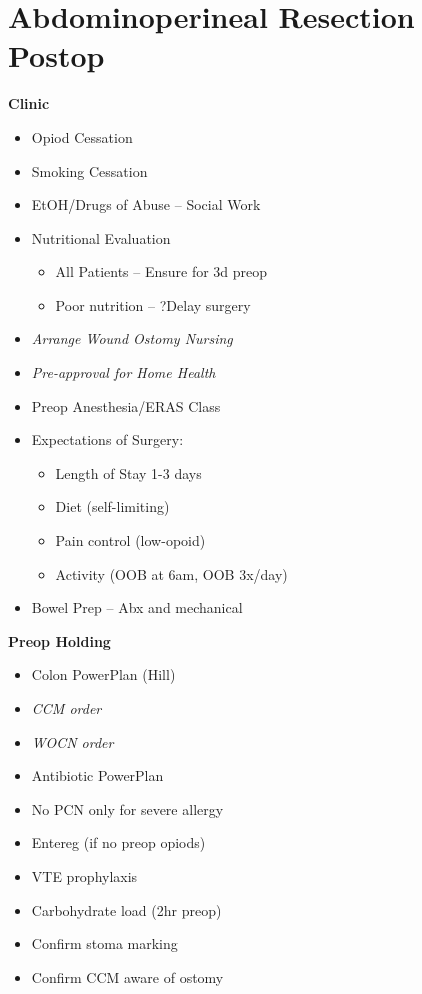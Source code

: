 \documentclass[
  letterpaper,
]{scrbook}
\providecommand{\tightlist}{%
  \setlength{\itemsep}{0pt}\setlength{\parskip}{0pt}}
\begin{document}
\chapter{Abdominoperineal Resection
Postop}\label{abdominoperineal-resection-postop}

\textbf{Clinic}

\begin{itemize}
\tightlist
\item
  Opiod Cessation
\item
  Smoking Cessation
\item
  EtOH/Drugs of Abuse -- Social Work
\item
  Nutritional Evaluation

  \begin{itemize}
  \tightlist
  \item
    All Patients -- Ensure for 3d preop
  \item
    Poor nutrition -- ?Delay surgery
  \end{itemize}
\item
  \emph{Arrange Wound Ostomy Nursing}
\item
  \emph{Pre-approval for Home Health}
\item
  Preop Anesthesia/ERAS Class
\item
  Expectations of Surgery:

  \begin{itemize}
  \tightlist
  \item
    Length of Stay 1-3 days
  \item
    Diet (self-limiting)
  \item
    Pain control (low-opoid)
  \item
    Activity (OOB at 6am, OOB 3x/day)
  \end{itemize}
\item
  Bowel Prep -- Abx and mechanical
\end{itemize}

\textbf{Preop Holding}

\begin{itemize}
\tightlist
\item
  Colon PowerPlan (Hill)
\item
  \emph{CCM order}
\item
  \emph{WOCN order}
\item
  Antibiotic PowerPlan
\item
  No PCN only for severe allergy
\item
  Entereg (if no preop opiods)
\item
  VTE prophylaxis
\item
  Carbohydrate load (2hr preop)
\item
  Confirm stoma marking
\item
  Confirm CCM aware of ostomy
\end{itemize}
\end{document}
